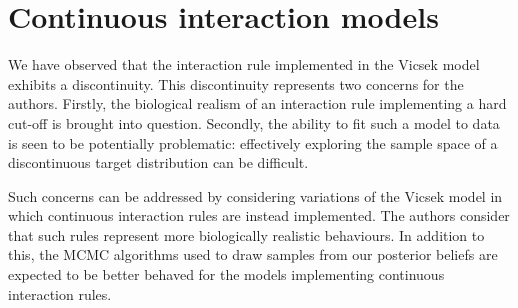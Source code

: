 \section{Continuous interaction models}

We have observed that the interaction rule implemented in the Vicsek model
exhibits a discontinuity. This discontinuity represents two concerns for the
authors. Firstly, the biological realism of an interaction rule implementing a
hard cut-off is brought into question. Secondly, the ability to fit such a
model to data is seen to be potentially problematic: effectively exploring the
sample space of a discontinuous target distribution can be difficult.

Such concerns can be addressed by considering variations of the Vicsek model in
which continuous interaction rules are instead implemented. The authors
consider that such rules represent more biologically realistic behaviours. In
addition to this, the MCMC algorithms used to draw samples from our posterior
beliefs are expected to be better behaved for the models implementing
continuous interaction rules.

